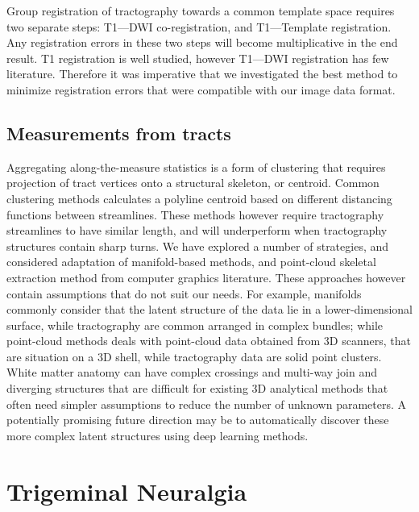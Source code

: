 Group registration of tractography towards a common template space requires two separate steps: T1---DWI co-registration, and T1---Template registration. Any registration errors in these two steps will become multiplicative in the end result. T1 registration is well studied, however T1---DWI registration has few literature. Therefore it was imperative that we investigated the best method to minimize registration errors that were compatible with our image data format.

\subsection{Measurements from tracts}
Aggregating along-the-measure statistics is a form of clustering that requires projection of tract vertices onto a structural skeleton, or centroid. Common clustering methods calculates a polyline centroid based on different distancing functions between streamlines. These methods however require tractography streamlines to have similar length, and will underperform when tractography structures contain sharp turns. We have explored a number of strategies, and considered adaptation of manifold-based methods, and point-cloud skeletal extraction method from computer graphics literature. These approaches however contain assumptions that do not suit our needs. For example, manifolds commonly consider that the latent structure of the data lie in a lower-dimensional surface, while tractography are common arranged in complex bundles; while point-cloud methods deals with point-cloud data obtained from 3D scanners, that are situation on a 3D shell, while tractography data are solid point clusters. White matter anatomy can have complex crossings and multi-way join and diverging structures that are difficult for existing 3D analytical methods that often need simpler assumptions to reduce the number of unknown parameters. A potentially promising future direction may be to automatically discover these more complex latent structures using deep learning methods. 

\section{Trigeminal Neuralgia}

